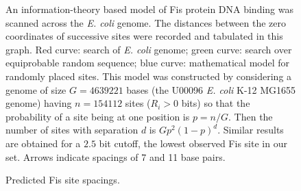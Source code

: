 \documentclass[doublespacing]{narfront}
\begin{document}
\begin{figure}[ht] %
\begin{center}
\end{center}
\vspace{-0.5 cm}
\caption{
Predicted Fis site spacings.
}
An information-theory based model of Fis protein DNA binding
was scanned across the \emph{E. coli} genome.
The distances between
the zero coordinates of
successive sites were recorded and tabulated
in this graph.
Red curve: 
search of \emph{E. coli} genome;
green curve:
search over equiprobable random sequence;
blue curve:
mathematical model for randomly placed sites.
This model was constructed
by considering
a genome of size $G=4639221$ bases (the U00096 \emph{E. coli} K-12 MG1655 genome)
having $n=154112$ sites ($R_i > 0$ bits) so that
the probability of a site being at one position is $p = n/G$.
Then the number of sites with separation $d$ is
$Gp^2(1-p)^d$.
Similar results are obtained for a $2.5$ bit cutoff,
the lowest observed Fis site in our set.
Arrows indicate spacings of 7 and 11 base pairs.
\label{fig.genomescan}
\end{figure} %
\end{document}
